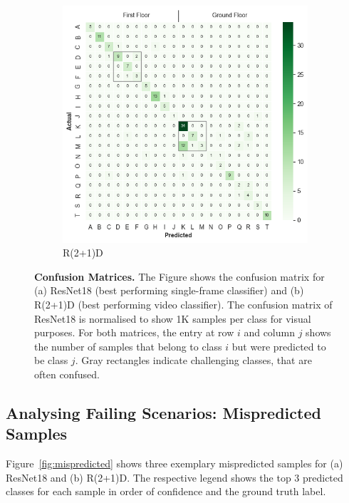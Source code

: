\documentclass[a4paper]{article}
\begin{document}
\begin{figure}
\begin{subfigure}[b]{0.49\textwidth}
    \includegraphics[width=\textwidth]{./figures/conf-matrix-r(2+1)d.png}
    \caption{R(2+1)D}
  \end{subfigure}
  \caption{
    \textbf{Confusion Matrices.} The Figure shows the confusion matrix for (a)
    ResNet18 (best performing single-frame classifier) and (b) R(2+1)D (best
    performing video classifier). The confusion matrix of ResNet18 is
    normalised to show 1K samples per class for visual purposes. For both
    matrices, the entry at row $i$ and column $j$ shows the number of samples
    that belong to class $i$ but were predicted to be class $j$. Gray
    rectangles indicate challenging classes, that are often confused.
  }
  \label{fig:conf-matrix}
\end{figure}


\subsection{Analysing Failing Scenarios: Mispredicted Samples} %
\label{sub:mispredicted}

Figure~\ref{fig:mispredicted} shows three exemplary mispredicted samples for
(a) ResNet18 and (b) R(2+1)D. The respective legend shows the top 3 predicted
classes for each sample in order of confidence and the ground truth label. 
\end{document}

